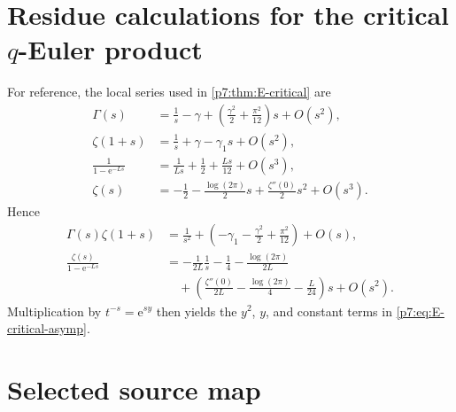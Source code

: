 \documentclass[11pt]{article}
\numberwithin{equation}{section}
\theoremstyle{definition}
\theoremstyle{remark}
\newcommand{\e}{\mathrm e}
\begin{document}
\endgroup

\section{Residue calculations for the critical $q$-Euler product}\label{p7:app:residues}

For reference, the local series used in \cref{p7:thm:E-critical} are
\begin{align*}
 \Gamma(s)&=\frac1s-\gamma+
 \left(\frac{\gamma^2}{2}+\frac{\pi^2}{12}\right)s+O(s^2),\\
 \zeta(1+s)&=\frac1s+\gamma-\gamma_1s+O(s^2),\\
 \frac1{1-\e^{-Ls}}&=\frac1{Ls}+\frac12+\frac{Ls}{12}+O(s^3),\\
 \zeta(s)&=-\frac12-\frac{\log(2\pi)}2s+\frac{\zeta''(0)}2s^2+O(s^3).
\end{align*}
Hence
\begin{align*}
 \Gamma(s)\zeta(1+s)
 &=\frac1{s^2}+
 \left(-\gamma_1-\frac{\gamma^2}{2}+\frac{\pi^2}{12}\right)+O(s),\\
 \frac{\zeta(s)}{1-\e^{-Ls}}
 &=-\frac1{2L}\frac1s
 -\frac14-\frac{\log(2\pi)}{2L}\\
 &\quad+
 \left(\frac{\zeta''(0)}{2L}
 -\frac{\log(2\pi)}4-\frac L{24}\right)s+O(s^2).
\end{align*}
Multiplication by $t^{-s}=\e^{sy}$ then yields the $y^2$, $y$, and constant terms in \cref{p7:eq:E-critical-asymp}.

\section{Selected source map}
\end{document}
